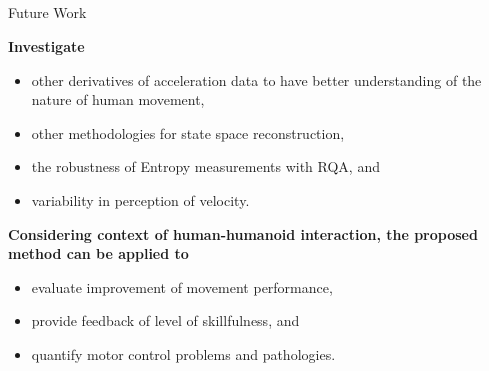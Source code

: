 \subsection{}
{

\begin{frame}{Future Work}

\textbf{Investigate}
\begin{itemize}
	\item other derivatives of acceleration data
	to have better understanding of the nature of human movement,
	\item other methodologies for state space reconstruction,
	\item the robustness of Entropy measurements with RQA, and 
	\item variability in perception of velocity.
\end{itemize}

\textbf{Considering context of human-humanoid interaction,
the proposed method can be applied to} 
\begin{itemize}
	\item evaluate improvement of movement performance,
	\item provide feedback of level of skillfulness, and 
	\item quantify motor control problems and pathologies.
\end{itemize}


\end{frame}
}




